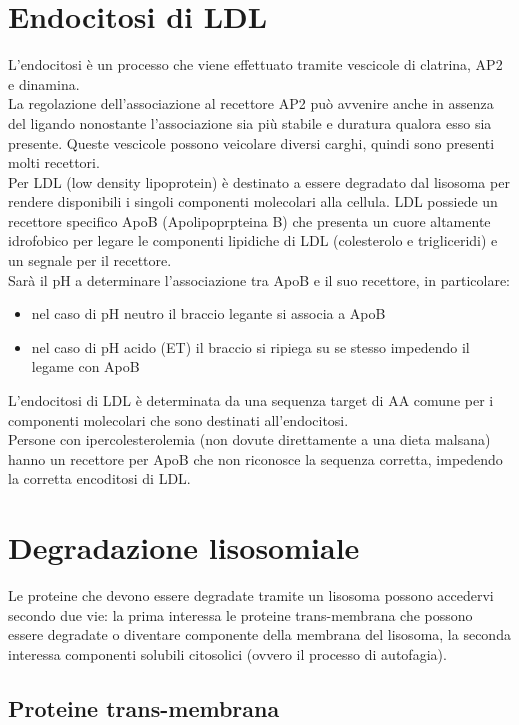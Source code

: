 \section{Endocitosi di LDL}
    L'endocitosi è un processo che viene effettuato tramite vescicole di clatrina, AP2 e dinamina.\\
    La regolazione dell'associazione al recettore AP2 può avvenire anche in assenza del ligando nonostante l'associazione sia più stabile e duratura qualora esso sia presente. Queste vescicole possono veicolare diversi carghi, quindi sono presenti molti recettori.  \\
    Per LDL (low density lipoprotein) è destinato a essere degradato dal lisosoma per rendere disponibili i singoli componenti molecolari alla cellula. 
    LDL possiede un recettore specifico ApoB (Apolipoprpteina B) che presenta un cuore altamente idrofobico per legare le componenti lipidiche di LDL (colesterolo e trigliceridi) e un segnale per il recettore. \\
    Sarà il pH a determinare l'associazione tra ApoB e il suo recettore, in particolare:
    \begin{itemize}
        \item nel caso di pH neutro il braccio legante si associa a ApoB
        \item nel caso di pH acido (ET) il braccio si ripiega su se stesso impedendo il legame con ApoB
    \end{itemize}
    L'endocitosi di LDL è determinata da una sequenza target di AA comune per i componenti molecolari che sono destinati all'endocitosi. \\
    Persone con ipercolesterolemia (non dovute direttamente a una dieta malsana) hanno un recettore per ApoB che non riconosce la sequenza corretta, impedendo la corretta encoditosi di LDL.

\section{Degradazione lisosomiale}
    Le proteine che devono essere degradate tramite un lisosoma possono accedervi secondo due vie: la prima interessa le proteine trans-membrana che possono essere degradate o diventare componente della membrana del lisosoma, la seconda interessa componenti solubili citosolici  (ovvero il processo di autofagia).
    
    \subsection{Proteine trans-membrana}
